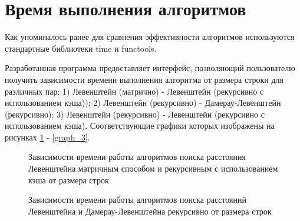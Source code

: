 \section{Время выполнения алгоритмов}
Как упоминалось ранее для сравнения эффективности алгоритмов используются стандартные библиотеки time и functools. 

Разработанная программа предоставляет интерфейс, позволяющий пользователю получить зависимости времени выполнения алгоритма от размера строки для различных пар: 1) Левенштейн (матрично) - Левенштейн (рекурсивно с использованием кэша)); 2) Левенштейн (рекурсивно) - Дамерау-Левенштейн (рекурсивно); 3) Левенштейн (рекурсивно) - Левенштейн (рекурсивно с использованием кэша). Соответствующие графики которых изображены на рисунках \ref{graph_1} - \ref{graph_3}.

\begin{figure}[p]
	\caption{Зависимости времени работы алгоритмов поиска расстояния Левенштейна матричным способом и рекурсивным с использованием кэша от размера строк}
	\label{graph_1}
\end{figure}
\begin{figure}[p]
	\caption{Зависимости времени работы алгоритмов поиска расстояний Левенштейна и Дамерау-Левенштейна рекурсивно от размера строк}
	\label{graph_2}
\end{figure}
